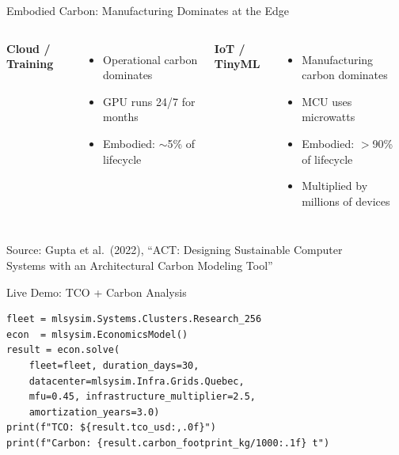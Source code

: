 \documentclass[aspectratio=169, 12pt]{beamer}
\begin{document}
\begin{frame}{Embodied Carbon: Manufacturing Dominates at the Edge}
\begin{columns}[T]
\textbf{Cloud / Training}
\begin{itemize}
  \item Operational carbon dominates
  \item GPU runs 24/7 for months
  \item Embodied: $\sim$5\% of lifecycle
\end{itemize}

\textbf{IoT / TinyML}
\begin{itemize}
  \item Manufacturing carbon dominates
  \item MCU uses microwatts
  \item Embodied: $>$90\% of lifecycle
  \item Multiplied by millions of devices
\end{itemize}
\end{columns}

\vspace{1em}
\begin{center}
\small
Source: Gupta et al.\ (2022), ``ACT: Designing Sustainable Computer\\
Systems with an Architectural Carbon Modeling Tool''
\end{center}
\end{frame}

\begin{frame}[fragile]{Live Demo: TCO + Carbon Analysis}
\begin{lstlisting}
fleet = mlsysim.Systems.Clusters.Research_256
econ  = mlsysim.EconomicsModel()
result = econ.solve(
    fleet=fleet, duration_days=30,
    datacenter=mlsysim.Infra.Grids.Quebec,
    mfu=0.45, infrastructure_multiplier=2.5,
    amortization_years=3.0)
print(f"TCO: ${result.tco_usd:,.0f}")
print(f"Carbon: {result.carbon_footprint_kg/1000:.1f} t")
\end{lstlisting}
\end{frame}
\end{document}
